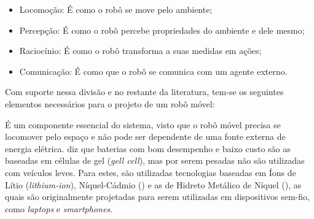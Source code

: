 \begin{itemize}
 \item Locomoção: É como o robô se move pelo ambiente; 
 
 \item Percepção: É como o robô percebe propriedades do ambiente e dele mesmo;
 
 \item Raciocínio: É como o robô transforma a suas medidas em ações;
 
 \item Comunicação: É como que o robô se comunica com um agente externo.
 
\end{itemize}

Com suporte nessa divisão e no restante da literatura, tem-se os seguintes elementos necessários para o projeto de um robô móvel:


 É um componente essencial do sistema, visto que o robô móvel precisa se locomover pelo espaço e não pode 
ser dependente de uma fonte externa de energia elétrica.  diz que baterias com bom desempenho e baixo custo são 
as baseadas em células de gel (\textit{gell cell}), 
mas por serem pesadas não são utilizadas com veículos 
leves. Para estes, são utilizadas tecnologias baseadas em Íons de Lítio (\textit{lithium-ion}), 
Níquel-Cádmio () e as de Hidreto Metálico de Níquel (), as quais são 
originalmente projetadas para serem utilizadas em dispositivos sem-fio, como \textit{laptops} e \textit{smartphones}.

